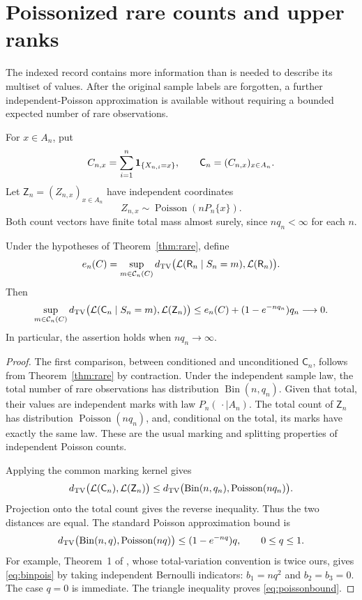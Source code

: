 \section{Poissonized rare counts and upper ranks}\label{sec:poisson}
The indexed record contains more information than is needed to describe its multiset of values. After the original sample labels are forgotten, a further independent-Poisson approximation is available without requiring a bounded expected number of rare observations.

For $x\in A_n$, put
\[
 C_{n,x}=\sum_{i=1}^n\mathbf 1_{\{X_{n,i}=x\}},\qquad
 \mathsf C_n=(C_{n,x})_{x\in A_n}.
\]
Let $\mathsf Z_n=(Z_{n,x})_{x\in A_n}$ have independent coordinates
\[
 Z_{n,x}\sim\operatorname{Poisson}(nP_n\{x\}).
\]
Both count vectors have finite total mass almost surely, since $nq_n<\infty$ for each $n$.

\begin{theorem}\label{thm:poisson}
Under the hypotheses of Theorem~\ref{thm:rare}, define
\[
 e_n(C)=\sup_{m\in\mathcal C_n(C)}
 d_{\mathrm{TV}}\bigl(\mathcal L(\mathsf R_n\mid S_n=m),\mathcal L(\mathsf R_n)\bigr).
\]
Then
\begin{equation}\label{eq:poissonbound}
 \sup_{m\in\mathcal C_n(C)}
 d_{\mathrm{TV}}\bigl(\mathcal L(\mathsf C_n\mid S_n=m),\mathcal L(\mathsf Z_n)\bigr)
 \le e_n(C)+(1-e^{-nq_n})q_n\longrightarrow0.
\end{equation}
In particular, the assertion holds when $nq_n\to\infty$.
\end{theorem}
\begin{proof}
The first comparison, between conditioned and unconditioned $\mathsf C_n$, follows from Theorem~\ref{thm:rare} by contraction. Under the independent sample law, the total number of rare observations has distribution $\operatorname{Bin}(n,q_n)$. Given that total, their values are independent marks with law $P_n(\,\cdot\mid A_n)$. The total count of $\mathsf Z_n$ has distribution $\operatorname{Poisson}(nq_n)$, and, conditional on the total, its marks have exactly the same law. These are the usual marking and splitting properties of independent Poisson counts.

Applying the common marking kernel gives
\[
 d_{\mathrm{TV}}\bigl(\mathcal L(\mathsf C_n),\mathcal L(\mathsf Z_n)\bigr)
 \le d_{\mathrm{TV}}\bigl(\operatorname{Bin}(n,q_n),\operatorname{Poisson}(nq_n)\bigr).
\]
Projection onto the total count gives the reverse inequality. Thus the two distances are equal. The standard Poisson approximation bound \cite{BH,AGG} is
\begin{equation}\label{eq:binpois}
 d_{\mathrm{TV}}\bigl(\operatorname{Bin}(n,q),\operatorname{Poisson}(nq)\bigr)
 \le(1-e^{-nq})q,\qquad 0\le q\le1.
\end{equation}
For example, Theorem~1 of \cite{AGG}, whose total-variation convention is twice ours, gives \eqref{eq:binpois} by taking independent Bernoulli indicators: $b_1=nq^2$ and $b_2=b_3=0$. The case $q=0$ is immediate. The triangle inequality proves \eqref{eq:poissonbound}.
\end{proof}


